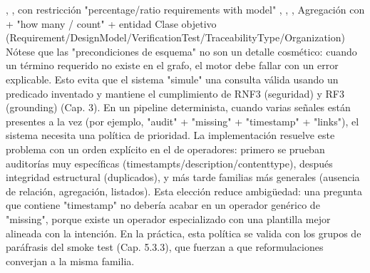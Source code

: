 , ,  \markdownRendererPipe{}  con restricción  \markdownRendererPipe{} \markdownRendererPipe{}  \markdownRendererPipe{} "percentage/ratio requirements with model" \markdownRendererPipe{} , , ,  \markdownRendererPipe{} Agregación con  +  \markdownRendererPipe{} \markdownRendererPipe{}  \markdownRendererPipe{} "how many / count" + entidad \markdownRendererPipe{} Clase objetivo (Requirement/DesignModel/VerificationTest/TraceabilityType/Organization) \markdownRendererPipe{}  \markdownRendererPipe{}\markdownRendererInterblockSeparator
{}Nótese que las "precondiciones de esquema" no son un detalle cosmético: cuando un término requerido no existe en el grafo, el motor debe fallar con un error explicable. Esto evita que el sistema "simule" una consulta válida usando un predicado inventado y mantiene el cumplimiento de RNF3 (seguridad) y RF3 (grounding) (Cap. 3).\markdownRendererInterblockSeparator
{}\markdownRendererInterblockSeparator
{}En un pipeline determinista, cuando varias señales están presentes a la vez (por ejemplo, "audit" + "missing" + "timestamp" + "links"), el sistema necesita una política de prioridad. La implementación resuelve este problema con un orden explícito en el  de operadores: primero se prueban auditorías muy específicas (timestampts/description/contenttype), después integridad estructural (duplicados), y más tarde familias más generales (ausencia de relación, agregación, listados).\markdownRendererInterblockSeparator
{}Esta elección reduce ambigüedad: una pregunta que contiene "timestamp" no debería acabar en un operador genérico de "missing", porque existe un operador especializado con una plantilla mejor alineada con la intención. En la práctica, esta política se valida con los grupos de paráfrasis del smoke test (Cap. 5.3.3), que fuerzan a que reformulaciones converjan a la misma familia.\markdownRendererInterblockSeparator
